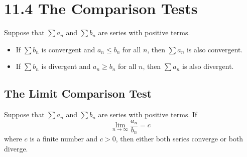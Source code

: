 %
%

\section*{11.4 The Comparison Tests}

Suppose that \(\sum{a_n}\) and \(\sum{b_n}\) are series with positive terms.
\begin{itemize}
    \item If \(\sum{b_n}\) is convergent and \(a_n \leq b_n\) for all \(n\),
then \(\sum{a_n}\) is also convergent.
    \item If \(\sum{b_n}\) is divergent and \(a_n \geq b_n\) for all \(n\), then
\(\sum{a_n}\) is also divergent.
\end{itemize}

\subsection*{The Limit Comparison Test}

Suppose that \(\sum{a_n}\) and \(\sum{b_n}\) are series with positive terms. If
\[\lim_{n \to \infty}{\frac{a_n}{b_n}} = c\]
where \(c\) is a finite number and \(c > 0\), then either both series converge
or both diverge.
